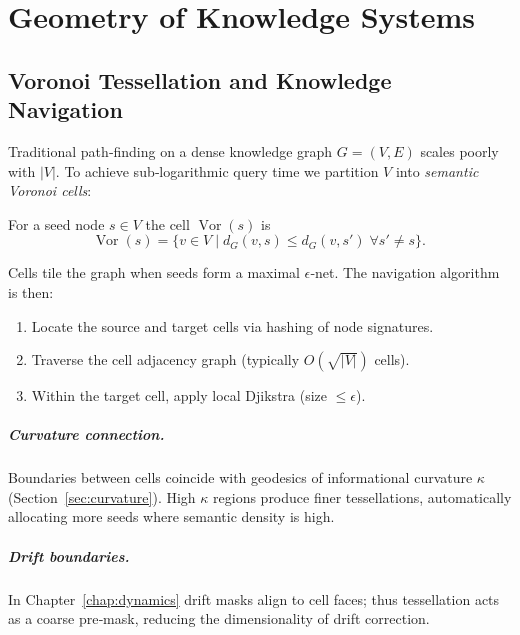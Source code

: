 
\chapter{Geometry of Knowledge Systems}\label{chap:geometry}
\section{Voronoi Tessellation and Knowledge Navigation}\label{sec:tessellation}

Traditional path‑finding on a dense knowledge graph $G=(V,E)$ scales poorly with $|V|$.
To achieve sub‑logarithmic query time we partition $V$ into \emph{semantic Voronoi cells}:
\begin{definition}
For a seed node $s\in V$ the cell $\operatorname{Vor}(s)$ is
\[
  \operatorname{Vor}(s)=\{v\in V\mid d_G(v,s)\le d_G(v,s')\;\forall s'\neq s\}.\,
\]
\end{definition}
Cells tile the graph when seeds form a maximal $\epsilon$‑net.  The navigation algorithm is then:
\begin{enumerate}
  \item Locate the source and target cells via hashing of node signatures.
  \item Traverse the cell adjacency graph (typically \(O(\sqrt{|V|})\) cells).
  \item Within the target cell, apply local Djikstra (size $\le\epsilon$).
\end{enumerate}

\paragraph{Curvature connection.}  Boundaries between cells coincide with geodesics of
informational curvature $\kappa$ (Section~\ref{sec:curvature}).  High $\kappa$ regions
produce finer tessellations, automatically allocating more seeds where semantic density is high.

\paragraph{Drift boundaries.}  In Chapter~\ref{chap:dynamics} drift masks align to cell
faces; thus tessellation acts as a coarse pre‑mask, reducing the dimensionality of drift
correction.

